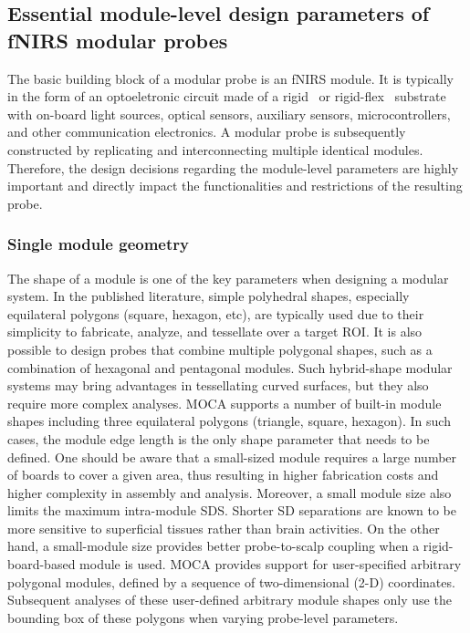 \subsection{Essential module-level design parameters of fNIRS modular probes}
The basic building block of a modular probe is an \ac{fNIRS} module. It is typically in the form of an optoeletronic circuit made of a rigid~\cite{Chitnis2016, Bci2017, Zhao2019, Wyser2017} or rigid-flex~\cite{Muehlemann2008, Hallacoglu2016} substrate with on-board light sources, optical sensors, auxiliary sensors, microcontrollers, and other communication electronics. A modular probe is subsequently constructed by replicating and interconnecting multiple identical modules. Therefore, the design decisions regarding the module-level parameters are highly important and directly impact the functionalities and restrictions of the resulting probe.

\subsubsection{Single module geometry}
The shape of a module is one of the key parameters when designing a modular system. In the published literature, simple polyhedral shapes, especially equilateral polygons (square, hexagon, etc), are typically used due to their simplicity to fabricate, analyze, and tessellate over a target ROI. It is also possible to design probes that combine multiple polygonal shapes, such as a combination of hexagonal and pentagonal modules. Such hybrid-shape modular systems may bring advantages in tessellating curved surfaces, but they also require more complex analyses. MOCA supports a number of built-in module shapes including three equilateral polygons (triangle, square, hexagon). In such cases, the module edge length is the only shape parameter that needs to be defined. One should be aware that a small-sized module requires a large number of boards to cover a given area, thus resulting in higher fabrication costs and higher complexity in assembly and analysis. Moreover, a small module size also limits the maximum intra-module SDS. Shorter SD separations are known to be more sensitive to superficial tissues rather than brain activities. On the other hand, a small-module size provides better probe-to-scalp coupling when a rigid-board-based module is used. MOCA provides support for user-specified arbitrary polygonal modules, defined by a sequence of two-dimensional (2-D) coordinates. Subsequent analyses of these user-defined arbitrary module shapes only use the bounding box of these polygons when varying probe-level parameters.

